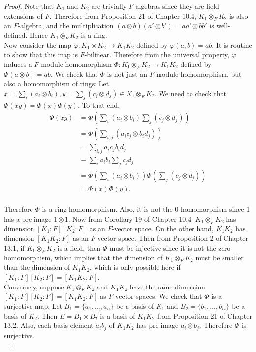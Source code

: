 \documentclass{article}
\begin{document}
  \begin{proof}
    Note that $K_1$ and $K_2$ are trivially $F$-algebras since they are
    field extensions of $F$. Therefore from Proposition 21 of Chapter 10.4,
    $K_1\otimes_F K_2$ is also an $F$-algebra, and the multiplication
    $(a\otimes b)(a'\otimes b')=aa'\otimes bb'$ is well-defined. Hence
    $K_1\otimes_F K_2$ is a ring. \\

    Now consider the map $\varphi:K_1\times K_2\rightarrow K_1K_2$ defined
    by $\varphi(a,b)=ab$. It is routine to show that this map is
    $F$-bilinear. Therefore from the universal property, $\varphi$ induces
    a $F$-module homomorphism $\Phi:K_1\otimes_F K_2\rightarrow K_1K_2$
    defined by $\Phi(a\otimes b)=ab$. We check that $\Phi$ is not just an
    $F$-module homomorphism, but also a homomorphism of rings: Let $x=\sum_i
    (a_i\otimes b_i), y=\sum_j (c_j\otimes d_j) \in K_1\otimes_F K_2$. We
    need to check that $\Phi(xy)=\Phi(x)\Phi(y)$. To that end,
    \begin{align*}
      \Phi(xy) &=\Phi \left(\sum_i (a_i\otimes b_i) \sum_j (c_j\otimes d_j)
        \right)\\
      &=\Phi \left(\sum_{i,j} (a_ic_j\otimes b_id_j) \right)\\
      &=\sum_{i,j} a_ic_jb_id_j\\
      &=\sum_{i} a_ib_i \sum_{j} c_jd_j\\
      &=\Phi \left(\sum_{i} (a_i\otimes b_i) \right) \Phi \left(\sum_{j}
        (c_j\otimes d_j) \right)\\
      &=\Phi(x)\Phi(y).\\
    \end{align*}

    Therefore $\Phi$ is a ring homomorphism. Also, it is not the 0
    homomorphism since 1 has a pre-image $1\otimes 1$. Now from Corollary
    19 of Chapter 10.4, $K_1\otimes_F K_2$ has dimension $[K_1:F][K_2:F]$
    as an $F$-vector space. On the other hand, $K_1K_2$ has dimension
    $[K_1K_2:F]$ as an $F$-vector space. Then from Proposition 2 of Chapter
    13.1, if $K_1\otimes_F K_2$ is a field, then $\Phi$ must be injective
    since it is not the zero homomorphism, which implies that the dimension
    of $K_1\otimes_F K_2$ must be smaller than the dimension of $K_1K_2$,
    which is only possible here if $[K_1:F][K_2:F]=[K_1K_2:F]$. \\

    Conversely, suppose $K_1\otimes_F K_2$ and $K_1K_2$ have the same
    dimension $[K_1:F][K_2:F]=[K_1K_2:F]$ as $F$-vector spaces. We check
    that $\Phi$ is a surjective map: Let $B_1=\{a_1,\ldots,a_n\}$ be a
    basis of $K_1$ and $B_2=\{b_1,\ldots,b_m\}$ be a
    basis of $K_2$. Then $B=B_1\times B_2$ is a basis of $K_1K_2$ from
    Proposition 21 of Chapter 13.2. Also, each basis element $a_ib_j$ of
    $K_1K_2$ has pre-image $a_i\otimes b_j$. Therefore $\Phi$ is
    surjective. \\


\end{proof}
\end{document}
